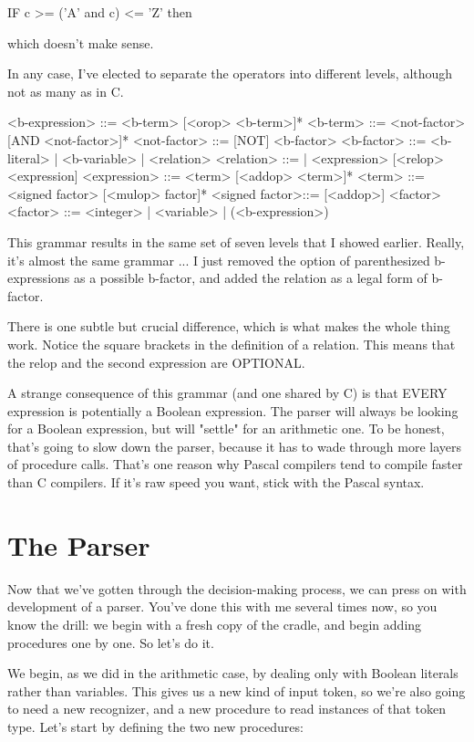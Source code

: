 \documentclass[float=false, crop=false]{standalone}
\begin{document}
     IF c >= ('A' and c) <= 'Z' then

which doesn't make sense.

In any case, I've elected to separate the operators into different levels,
although not as many as in C.

 <b-expression> ::= <b-term> [<orop> <b-term>]*
 <b-term>       ::= <not-factor> [AND <not-factor>]*
 <not-factor>   ::= [NOT] <b-factor>
 <b-factor>     ::= <b-literal> | <b-variable> | <relation>
 <relation>     ::= | <expression> [<relop> <expression]
 <expression>   ::= <term> [<addop> <term>]*
 <term>         ::= <signed factor> [<mulop> factor]*
 <signed factor>::= [<addop>] <factor>
 <factor>       ::= <integer> | <variable> | (<b-expression>)


This grammar results in the same set of seven levels that I showed earlier.
Really, it's almost the same grammar ... I just removed the option of
parenthesized b-expressions as a possible b-factor, and added the relation as a
legal form of b-factor.

There is one subtle but crucial difference, which is what makes the whole thing
work. Notice the square brackets in the definition of a relation. This means
that the relop and the second expression are OPTIONAL.

A strange consequence of this grammar (and one shared by C) is that EVERY
expression is potentially a Boolean expression. The parser will always be
looking for a Boolean expression, but will "settle" for an arithmetic one. To be
honest, that's going to slow down the parser, because it has to wade through
more layers of procedure calls. That's one reason why Pascal compilers tend to
compile faster than C compilers. If it's raw speed you want, stick with the
Pascal syntax.

\section{The Parser}

Now that we've gotten through the decision-making process, we can press on with
development of a parser. You've done this with me several times now, so you know
the drill: we begin with a fresh copy of the cradle, and begin adding procedures
one by one. So let's do it.

We begin, as we did in the arithmetic case, by dealing only with Boolean
literals rather than variables. This gives us a new kind of input token, so
we're also going to need a new recognizer, and a new procedure to read instances
of that token type. Let's start by defining the two new procedures:
\end{document}
